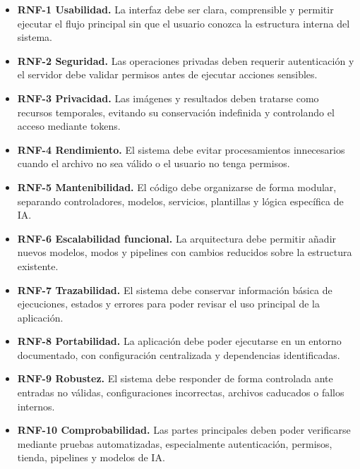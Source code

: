 \begingroup
\small
\begin{itemize}
	\setlength{\itemsep}{0.35em}
	\setlength{\parsep}{0pt}
	
	\item \textbf{RNF-1 Usabilidad.} La interfaz debe ser clara, comprensible y permitir ejecutar el flujo principal sin que el usuario conozca la estructura interna del sistema.
	
	\item \textbf{RNF-2 Seguridad.} Las operaciones privadas deben requerir autenticación y el servidor debe validar permisos antes de ejecutar acciones sensibles.
	
	\item \textbf{RNF-3 Privacidad.} Las imágenes y resultados deben tratarse como recursos temporales, evitando su conservación indefinida y controlando el acceso mediante tokens.
	
	\item \textbf{RNF-4 Rendimiento.} El sistema debe evitar procesamientos innecesarios cuando el archivo no sea válido o el usuario no tenga permisos.
	
	\item \textbf{RNF-5 Mantenibilidad.} El código debe organizarse de forma modular, separando controladores, modelos, servicios, plantillas y lógica específica de IA.
	
	\item \textbf{RNF-6 Escalabilidad funcional.} La arquitectura debe permitir añadir nuevos modelos, modos y pipelines con cambios reducidos sobre la estructura existente.
	
	\item \textbf{RNF-7 Trazabilidad.} El sistema debe conservar información básica de ejecuciones, estados y errores para poder revisar el uso principal de la aplicación.
	
	\item \textbf{RNF-8 Portabilidad.} La aplicación debe poder ejecutarse en un entorno documentado, con configuración centralizada y dependencias identificadas.
	
	\item \textbf{RNF-9 Robustez.} El sistema debe responder de forma controlada ante entradas no válidas, configuraciones incorrectas, archivos caducados o fallos internos.
	
	\item \textbf{RNF-10 Comprobabilidad.} Las partes principales deben poder verificarse mediante pruebas automatizadas, especialmente autenticación, permisos, tienda, pipelines y modelos de IA.
\end{itemize}
\endgroup

